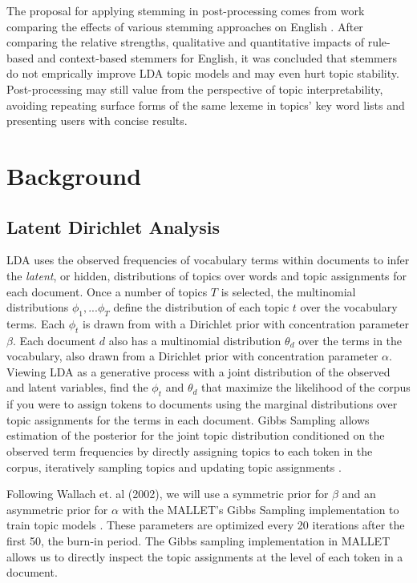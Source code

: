 \documentclass[11pt,a4paper]{article}
\begin{document}
The proposal for applying stemming in post-processing comes from work comparing the effects of various stemming approaches on English \cite{schofield-mimno-2016-comparing}. After comparing the relative strengths, qualitative and quantitative impacts of rule-based and context-based stemmers for English, it was concluded that stemmers do not emprically improve LDA topic models and may even hurt topic stability. Post-processing may still value from the perspective of topic interpretability, avoiding repeating surface forms of the same lexeme in topics' key word lists and presenting users with concise results.


\section{Background}

\subsection{Latent Dirichlet Analysis}
LDA uses the observed frequencies of vocabulary terms within documents to infer the \textit{latent}, or hidden, distributions of topics over words and topic assignments for each document. Once a number of topics $T$ is selected, the multinomial distributions $\phi_1,...\phi_T$ define the distribution of each topic $t$ over the vocabulary terms. Each $\phi_t$ is drawn from with a Dirichlet prior with concentration parameter $\beta$. Each document $d$ also has a multinomial distribution $\theta_d$ over the terms in the vocabulary, also drawn from a Dirichlet prior with concentration parameter $\alpha$. Viewing LDA as a generative process with a joint distribution of the observed and latent variables, find the $\phi_t$ and $\theta_d$ that maximize the likelihood of the corpus if you were to assign tokens to documents using the marginal distributions over topic assignments for the terms in each document. Gibbs Sampling allows estimation of the posterior for the joint topic distribution conditioned on the observed term frequencies by directly assigning topics to each token in the corpus, iteratively sampling topics and updating topic assignments
 \cite{steyvers2007probabilistic, blei2003,schofield-mimno-2016-comparing}.

Following Wallach et. al (2002), we will use a symmetric prior for $\beta$ and an asymmetric prior for $\alpha$ with the MALLET's Gibbs Sampling implementation to train topic models \cite{wallach2009rethinking,McCallumMALLET}. These parameters are optimized every 20 iterations after the first 50, the burn-in period. The Gibbs sampling implementation in MALLET allows us to directly inspect the topic assignments at the level of each token in a document.
\end{document}
